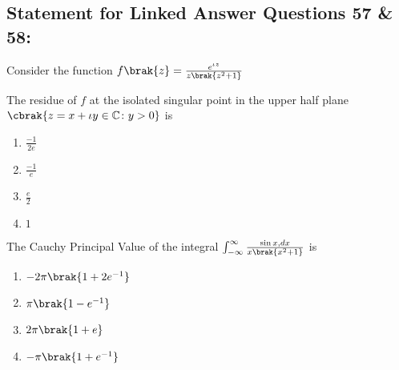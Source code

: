 \subsection*{Statement for Linked Answer Questions 57 \& 58:}
Consider the function $f\brak{z} = \frac{e^{\iota z}}{z\brak{z^2+1}}$
\item The residue of $f$ at the isolated singular point in the upper half plane $\cbrak{z = x+ \iota y \in \mathbb{C} \colon y > 0}$ is
\begin{multicols}{2}
    \begin{enumerate}
        \item $\frac{-1}{2e}$
        \item $\frac{-1}{e}$
        \item $\frac{e}{2}$
        \item $1$
    \end{enumerate}
\end{multicols}
\item The Cauchy Principal Value of the integral $\int_{-\infty} ^ {\infty} \frac{\sin {x}, dx }{x\brak{x^2 + 1}}$ is
\begin{multicols}{2}
    \begin{enumerate}
        \item $-2 \pi \brak{1 + 2e^{-1}}$
        \item $\pi \brak{1 - e ^{-1}}$
        \item $2 \pi \brak{1+e}$
        \item $-\pi \brak{1 + e^{-1}}$
    \end{enumerate}
\end{multicols}

